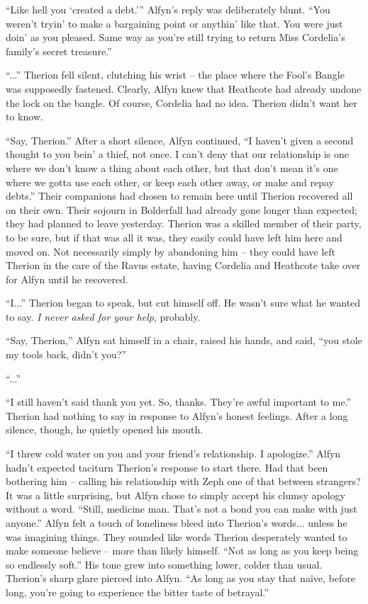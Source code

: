 ``Like hell you `created a debt.''' Alfyn's reply was deliberately blunt. ``You weren't tryin' to make a bargaining point or anythin' like that. You were just doin' as you pleased. Same way as you're still trying to return Miss Cordelia's family's secret treasure.''

``...'' Therion fell silent, clutching his wrist -- the place where the Fool's Bangle was supposedly fastened. Clearly, Alfyn knew that Heathcote had already undone the lock on the bangle. Of course, Cordelia had no idea. Therion didn't want her to know.

``Say, Therion.'' After a short silence, Alfyn continued, ``I haven't given a second thought to you bein' a thief, not once. I can't deny that our relationship is one where we don't know a thing about each other, but that don't mean it's one where we gotta use each other, or keep each other away, or make and repay debts.'' Their companions had chosen to remain here until Therion recovered all on their own. Their sojourn in Bolderfall had already gone longer than expected; they had planned to leave yesterday. Therion was a skilled member of their party, to be sure, but if that was all it was, they easily could have left him here and moved on. Not necessarily simply by abandoning him -- they could have left Therion in the care of the Ravus estate, having Cordelia and Heathcote take over for Alfyn until he recovered.

``I...'' Therion began to speak, but cut himself off. He wasn't sure what he wanted to say. \emph{I never asked for your help}, probably.

``Say, Therion,'' Alfyn sat himself in a chair, raised his hands, and said, ``you stole my tools back, didn't you?''

``...''

``I still haven't said thank you yet. So, thanks. They're awful important to me.'' Therion had nothing to say in response to Alfyn's honest feelings. After a long silence, though, he quietly opened his mouth.

``I threw cold water on you and your friend's relationship. I apologize.'' Alfyn hadn't expected taciturn Therion's response to start there. Had that been bothering him -- calling his relationship with Zeph one of that between strangers? It was a little surprising, but Alfyn chose to simply accept his clumsy apology without a word. ``Still, medicine man. That's not a bond you can make with just anyone.'' Alfyn felt a touch of loneliness bleed into Therion's words... unless he was imagining things. They sounded like words Therion desperately wanted to make someone believe -- more than likely himself. ``Not as long as you keep being so endlessly soft.'' His tone grew into something lower, colder than usual. Therion's sharp glare pierced into Alfyn. ``As long as you stay that naïve, before long, you're going to experience the bitter taste of betrayal.''

